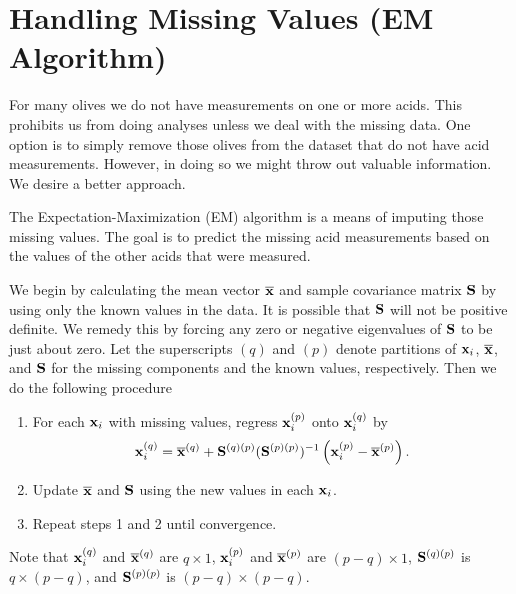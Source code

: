 \section{Handling Missing Values (EM Algorithm)}

For many olives we do not have measurements on one or more acids. This prohibits us from doing analyses unless we deal with the missing data. One option is to simply remove those olives from the dataset that do not have acid measurements. However, in doing so we might throw out valuable information. We desire a better approach.

The Expectation-Maximization (EM) algorithm is a means of imputing those missing values. The goal is to predict the missing acid measurements based on the values of the other acids that were measured.

We begin by calculating the mean vector $\overline{\mathbf{\bm{x}}}$ and sample covariance matrix $\mathbf{\bm{S}}$ by using only the known values in the data. It is possible that $\mathbf{\bm{S}}$ will not be positive definite. We remedy this by forcing any zero or negative eigenvalues of $\mathbf{\bm{S}}$ to be just about zero. Let the superscripts $(q)$ and $(p)$ denote partitions of $\mathbf{\bm{x}}_i$, $\overline{\mathbf{\bm{x}}}$, and $\mathbf{\bm{S}}$ for the missing components and the known values, respectively. Then we do the following procedure

\begin{enumerate}
\item For each $\mathbf{\bm{x}}_i$ with missing values, regress $\mathbf{\bm{x}}_i^{(p)}$ onto $\mathbf{\bm{x}}_i^{(q)}$ by
\begin{eqnarray*}
\mathbf{\bm{x}}_i^{(q)} = \overline{\mathbf{\bm{x}}}^{(q)} + \mathbf{\bm{S}}^{(q)(p)}(\mathbf{\bm{S}}^{(p)(p)})^{-1}\left(\mathbf{\bm{x}}_i^{(p)}-\overline{\mathbf{\bm{x}}}^{(p)}\right). 
\end{eqnarray*}
\item Update $\overline{\mathbf{\bm{x}}}$ and $\mathbf{\bm{S}}$ using the new values in each $\mathbf{\bm{x}}_i$.
\item Repeat steps 1 and 2 until convergence.
\end{enumerate}

\noindent Note that $\mathbf{\bm{x}}_i^{(q)}$ and $\overline{\mathbf{\bm{x}}}^{(q)}$ are $q\times1$, $\mathbf{\bm{x}}_i^{(p)}$ and $\overline{\mathbf{\bm{x}}}^{(p)}$ are $(p-q)\times1$, $\mathbf{\bm{S}}^{(q)(p)}$ is $q\times(p-q)$, and $\mathbf{\bm{S}}^{(p)(p)}$ is $(p-q)\times(p-q)$.

